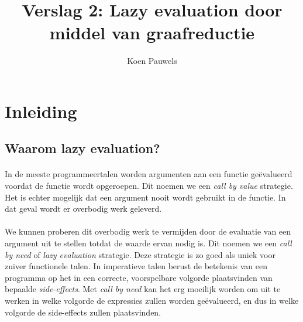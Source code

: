 \documentclass[a4paper,10pt]{article}
\begin{document}
\lstset{language=Haskell}
\title{Verslag 2: Lazy evaluation door middel van graafreductie}
\author{Koen Pauwels}
\maketitle

\section{Inleiding}
\subsection{Waarom lazy evaluation?}
\paragraph{}
In de meeste programmeertalen worden argumenten aan een functie ge{\"e}valueerd voordat de functie wordt opgeroepen.
Dit noemen we een \emph{call by value} strategie.
Het is echter mogelijk dat een argument nooit wordt gebruikt in de functie.
In dat geval wordt er overbodig werk geleverd.
\paragraph{}
We kunnen proberen dit overbodig werk te vermijden door de evaluatie van een argument uit te stellen totdat de waarde ervan nodig is.
Dit noemen we een \emph{call by need} of \emph{lazy evaluation} strategie.
Deze strategie is zo goed als uniek voor zuiver functionele talen.
In imperatieve talen berust de betekenis van een programma op het in een correcte, voorspelbare volgorde plaatsvinden van bepaalde \emph{side-effects}.
Met \emph{call by need} kan het erg moeilijk worden om uit te werken in welke volgorde de expressies zullen worden ge{\"e}valueerd, en dus in welke volgorde de side-effects zullen plaatsvinden.
\paragraph{}
\end{document}
